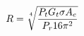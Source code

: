 \documentclass[preview]{standalone}
\begin{document}
\begin{align*}
R = \sqrt[\uproot{3}4]{\frac{P_t G_t \sigma A_e}{P_r 16 \pi^2}}
\end{align*}
\end{document}
